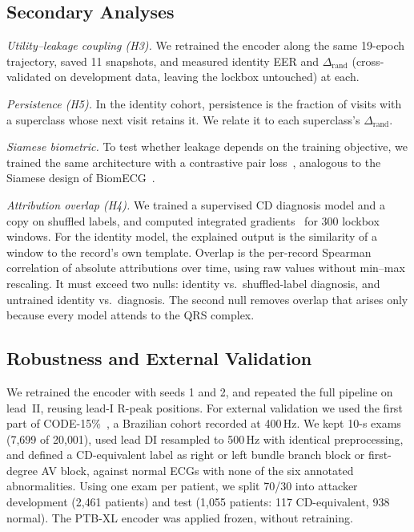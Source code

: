\documentclass[journal]{IEEEtran}
\newcommand{\drand}{\Delta_{\mathrm{rand}}}
\begin{document}
\subsection{Secondary Analyses}
\emph{Utility--leakage coupling (H3).} We retrained the encoder along the same 19-epoch trajectory, saved 11 snapshots, and measured identity EER and $\drand$ (cross-validated on development data, leaving the lockbox untouched) at each.

\emph{Persistence (H5).} In the identity cohort, persistence is the fraction of visits with a superclass whose next visit retains it. We relate it to each superclass's $\drand$.

\emph{Siamese biometric.} To test whether leakage depends on the training objective, we trained the same architecture with a contrastive pair loss~\cite{hadsell2006dimensionality}, analogous to the Siamese design of BiomECG~\cite{thiebaud2026biomecg}.

\emph{Attribution overlap (H4).} We trained a supervised CD diagnosis model and a copy on shuffled labels, and computed integrated gradients~\cite{sundararajan2017axiomatic} for 300 lockbox windows. For the identity model, the explained output is the similarity of a window to the record's own template. Overlap is the per-record Spearman correlation of absolute attributions over time, using raw values without min--max rescaling. It must exceed two nulls: identity vs.\ shuffled-label diagnosis, and untrained identity vs.\ diagnosis. The second null removes overlap that arises only because every model attends to the QRS complex.

\subsection{Robustness and External Validation}
We retrained the encoder with seeds 1 and 2, and repeated the full pipeline on lead~II, reusing lead-I R-peak positions. For external validation we used the first part of CODE-15\%~\cite{ribeiro2021code15,ribeiro2020automatic}, a Brazilian cohort recorded at 400\,Hz. We kept 10-s exams (7{,}699 of 20{,}001), used lead DI resampled to 500\,Hz with identical preprocessing, and defined a CD-equivalent label as right or left bundle branch block or first-degree AV block, against normal ECGs with none of the six annotated abnormalities. Using one exam per patient, we split 70/30 into attacker development (2{,}461 patients) and test (1{,}055 patients: 117 CD-equivalent, 938 normal). The PTB-XL encoder was applied frozen, without retraining.
\end{document}
